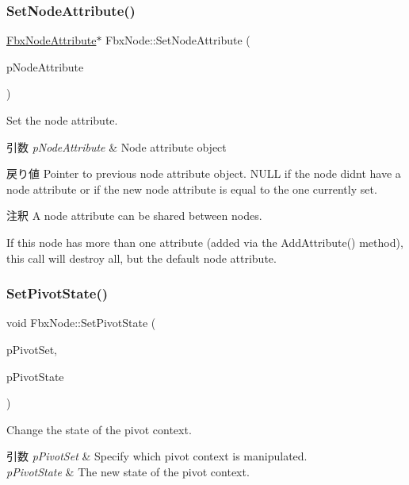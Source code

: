 \subsubsection{\texorpdfstring{Set\+Node\+Attribute()}{SetNodeAttribute()}}
{\footnotesize\ttfamily \hyperlink{class_fbx_node_attribute}{Fbx\+Node\+Attribute}$\ast$ Fbx\+Node\+::\+Set\+Node\+Attribute (\begin{DoxyParamCaption}\item[{\hyperlink{class_fbx_node_attribute}{Fbx\+Node\+Attribute} $\ast$}]{p\+Node\+Attribute }\end{DoxyParamCaption})}

Set the node attribute. 
\begin{DoxyParams}{引数}
{\em p\+Node\+Attribute} & Node attribute object \\
\hline
\end{DoxyParams}
\begin{DoxyReturn}{戻り値}
Pointer to previous node attribute object. {\ttfamily N\+U\+LL} if the node didn\textquotesingle{}t have a node attribute or if the new node attribute is equal to the one currently set. 
\end{DoxyReturn}
\begin{DoxyRemark}{注釈}
A node attribute can be shared between nodes. 

If this node has more than one attribute (added via the Add\+Attribute() method), this call will destroy all, but the default node attribute. 
\end{DoxyRemark}
\mbox{\label{class_fbx_node_ab1d3cf6ac101fe39387f026e72955a4e}} 
\subsubsection{\texorpdfstring{Set\+Pivot\+State()}{SetPivotState()}}
{\footnotesize\ttfamily void Fbx\+Node\+::\+Set\+Pivot\+State (\begin{DoxyParamCaption}\item[{\hyperlink{class_fbx_node_ae62b7311ac4727654cdf1ebd5cbf7343}{E\+Pivot\+Set}}]{p\+Pivot\+Set,  }\item[{\hyperlink{class_fbx_node_a153fc75958227fc6728a2233b630b58a}{E\+Pivot\+State}}]{p\+Pivot\+State }\end{DoxyParamCaption})}

Change the state of the pivot context. 
\begin{DoxyParams}{引数}
{\em p\+Pivot\+Set} & Specify which pivot context is manipulated. \\
\hline
{\em p\+Pivot\+State} & The new state of the pivot context. \\
\hline
\end{DoxyParams}
\mbox{\label{class_fbx_node_ac40aa0ae2187a83a8195cb31e49df18e}} 
